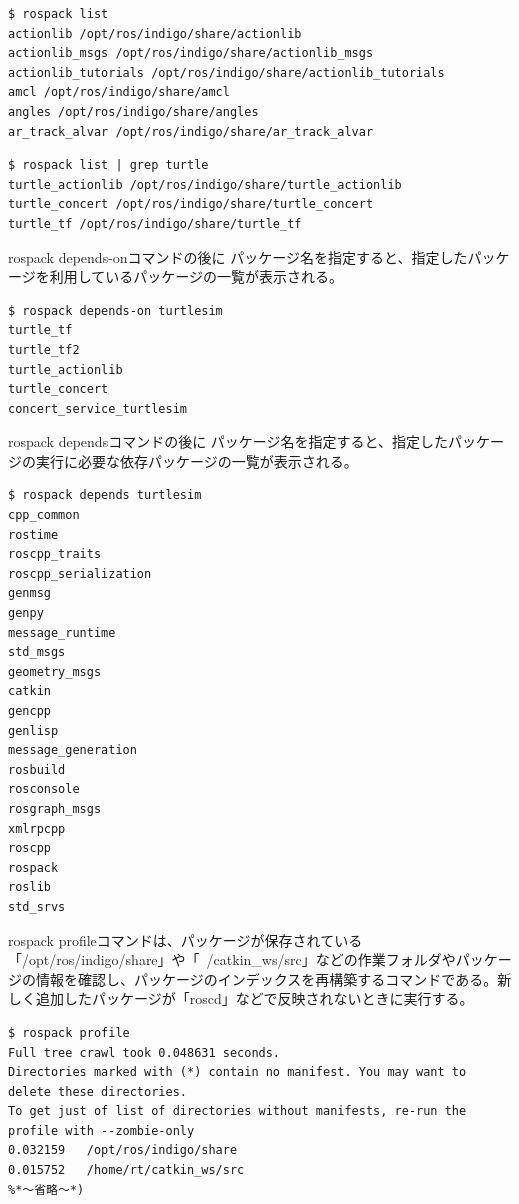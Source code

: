 \begin{lstlisting}[language=ROS]
$ rospack list
actionlib /opt/ros/indigo/share/actionlib
actionlib_msgs /opt/ros/indigo/share/actionlib_msgs
actionlib_tutorials /opt/ros/indigo/share/actionlib_tutorials
amcl /opt/ros/indigo/share/amcl
angles /opt/ros/indigo/share/angles
ar_track_alvar /opt/ros/indigo/share/ar_track_alvar
\end{lstlisting}

\begin{lstlisting}[language=ROS]
$ rospack list | grep turtle
turtle_actionlib /opt/ros/indigo/share/turtle_actionlib
turtle_concert /opt/ros/indigo/share/turtle_concert
turtle_tf /opt/ros/indigo/share/turtle_tf
\end{lstlisting}

rospack depends-onコマンドの後に パッケージ名を指定すると、指定したパッケージを利用しているパッケージの一覧が表示される。

\begin{lstlisting}[language=ROS]
$ rospack depends-on turtlesim
turtle_tf
turtle_tf2
turtle_actionlib
turtle_concert
concert_service_turtlesim
\end{lstlisting}

rospack dependsコマンドの後に パッケージ名を指定すると、指定したパッケージの実行に必要な依存パッケージの一覧が表示される。

\begin{lstlisting}[language=ROS]
$ rospack depends turtlesim
cpp_common
rostime
roscpp_traits
roscpp_serialization
genmsg
genpy
message_runtime
std_msgs
geometry_msgs
catkin
gencpp
genlisp
message_generation
rosbuild
rosconsole
rosgraph_msgs
xmlrpcpp
roscpp
rospack
roslib
std_srvs
\end{lstlisting}

rospack profileコマンドは、パッケージが保存されている「/opt/ros/indigo/share」や「~/catkin\_ws/src」などの作業フォルダやパッケージの情報を確認し、パッケージのインデックスを再構築するコマンドである。新しく追加したパッケージが「roscd」などで反映されないときに実行する。

\begin{lstlisting}[language=ROS]
$ rospack profile
Full tree crawl took 0.048631 seconds.
Directories marked with (*) contain no manifest. You may want to delete these directories.
To get just of list of directories without manifests, re-run the profile with --zombie-only
0.032159   /opt/ros/indigo/share
0.015752   /home/rt/catkin_ws/src
%*〜省略〜*)
\end{lstlisting}

